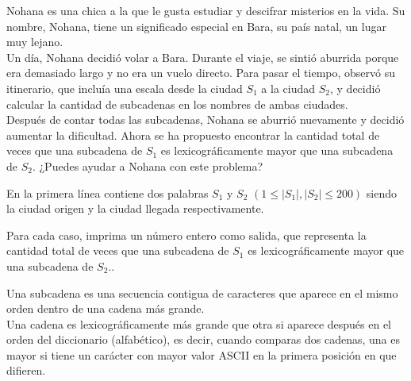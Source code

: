 
Nohana es una chica a la que le gusta estudiar y descifrar misterios en la vida. Su nombre, Nohana, tiene un significado especial en Bara, su país natal, un lugar muy lejano.\\

Un día, Nohana decidió volar a Bara. Durante el viaje, se sintió aburrida porque era demasiado largo y no era un vuelo directo. Para pasar el tiempo, observó su itinerario, que incluía una escala desde la ciudad $S_1$ a la ciudad $S_2$, y decidió calcular la cantidad de subcadenas en los nombres de ambas ciudades.\\

Después de contar todas las subcadenas, Nohana se aburrió nuevamente y decidió aumentar la dificultad. Ahora se ha propuesto encontrar la cantidad total de veces que una subcadena de $S_1$ es lexicográficamente mayor que una subcadena de $S_2$. ¿Puedes ayudar a Nohana con este problema?


En la primera línea contiene dos palabras $S_1$ y $S_2$ $(1 \le |S_1|,|S_2| \le 200)$ siendo la ciudad origen y la ciudad llegada respectivamente.

\outputText

Para cada caso, imprima un número entero como salida, que representa la cantidad total de veces que una subcadena de $S_1$ es lexicográficamente mayor que una subcadena de $S_2$..

\exampleCases

\begin{example}
\end{example}

\explanationText

Una subcadena es una secuencia contigua de caracteres que aparece en el mismo orden dentro de una cadena más grande.\\

Una cadena es lexicográficamente más grande que otra si aparece después en el orden del diccionario (alfabético), es decir, cuando comparas dos cadenas, una es mayor si tiene un carácter con mayor valor ASCII en la primera posición en que difieren.